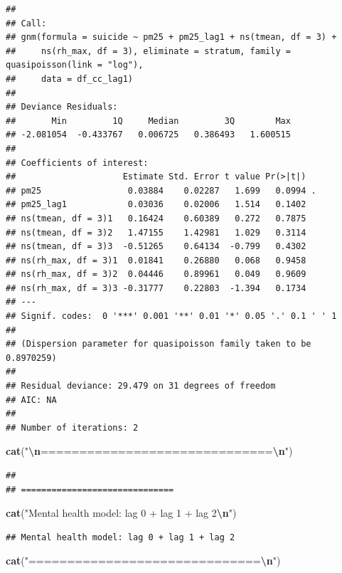 \documentclass[
]{article}
\newenvironment{Shaded}{\begin{snugshade}}{\end{snugshade}}
\newcommand{\FunctionTok}[1]{\textcolor[rgb]{0.13,0.29,0.53}{\textbf{#1}}}
\newcommand{\NormalTok}[1]{#1}
\newcommand{\SpecialCharTok}[1]{\textcolor[rgb]{0.81,0.36,0.00}{\textbf{#1}}}
\newcommand{\StringTok}[1]{\textcolor[rgb]{0.31,0.60,0.02}{#1}}
\begin{document}
\begin{verbatim}
## 
## Call:
## gnm(formula = suicide ~ pm25 + pm25_lag1 + ns(tmean, df = 3) + 
##     ns(rh_max, df = 3), eliminate = stratum, family = quasipoisson(link = "log"), 
##     data = df_cc_lag1)
## 
## Deviance Residuals: 
##       Min         1Q     Median         3Q        Max  
## -2.081054  -0.433767   0.006725   0.386493   1.600515  
## 
## Coefficients of interest:
##                     Estimate Std. Error t value Pr(>|t|)  
## pm25                 0.03884    0.02287   1.699   0.0994 .
## pm25_lag1            0.03036    0.02006   1.514   0.1402  
## ns(tmean, df = 3)1   0.16424    0.60389   0.272   0.7875  
## ns(tmean, df = 3)2   1.47155    1.42981   1.029   0.3114  
## ns(tmean, df = 3)3  -0.51265    0.64134  -0.799   0.4302  
## ns(rh_max, df = 3)1  0.01841    0.26880   0.068   0.9458  
## ns(rh_max, df = 3)2  0.04446    0.89961   0.049   0.9609  
## ns(rh_max, df = 3)3 -0.31777    0.22803  -1.394   0.1734  
## ---
## Signif. codes:  0 '***' 0.001 '**' 0.01 '*' 0.05 '.' 0.1 ' ' 1
## 
## (Dispersion parameter for quasipoisson family taken to be 0.8970259)
## 
## Residual deviance: 29.479 on 31 degrees of freedom
## AIC: NA
## 
## Number of iterations: 2
\end{verbatim}

\begin{Shaded}
\begin{Highlighting}[]
\FunctionTok{cat}\NormalTok{(}\StringTok{"}\SpecialCharTok{\textbackslash{}n}\StringTok{==============================}\SpecialCharTok{\textbackslash{}n}\StringTok{"}\NormalTok{)}
\end{Highlighting}
\end{Shaded}

\begin{verbatim}
## 
## ==============================
\end{verbatim}

\begin{Shaded}
\begin{Highlighting}[]
\FunctionTok{cat}\NormalTok{(}\StringTok{"Mental health model: lag 0 + lag 1 + lag 2}\SpecialCharTok{\textbackslash{}n}\StringTok{"}\NormalTok{)}
\end{Highlighting}
\end{Shaded}

\begin{verbatim}
## Mental health model: lag 0 + lag 1 + lag 2
\end{verbatim}

\begin{Shaded}
\begin{Highlighting}[]
\FunctionTok{cat}\NormalTok{(}\StringTok{"==============================}\SpecialCharTok{\textbackslash{}n}\StringTok{"}\NormalTok{)}
\end{Highlighting}
\end{Shaded}
\end{document}
